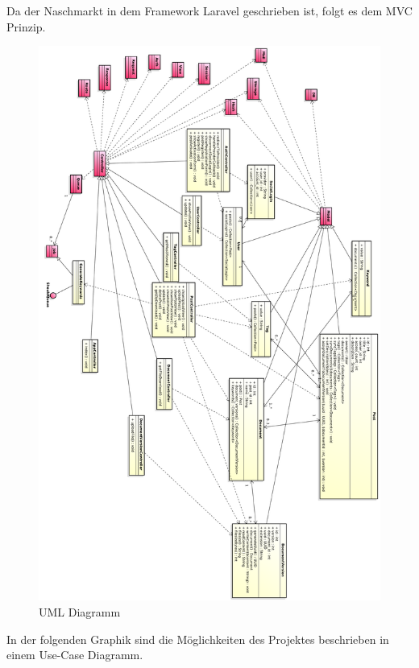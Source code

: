 Da der Naschmarkt in dem Framework Laravel geschrieben ist, folgt es dem MVC Prinzip.

\begin{figure}[H]
	\begin{center}
		\includegraphics[width=\linewidth]{images/UML_Classdiagramm.pdf}
		\caption{UML Diagramm}
	\end{center}
\end{figure}

In der folgenden Graphik sind die M\"oglichkeiten des Projektes beschrieben in einem Use-Case Diagramm.

